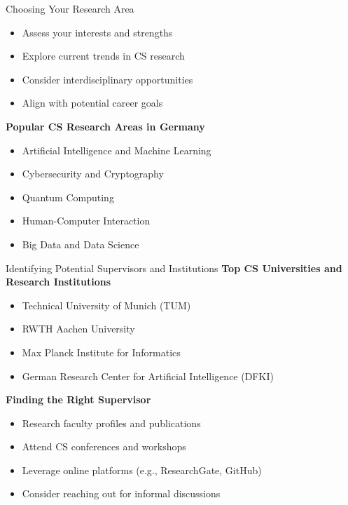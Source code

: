 \documentclass[aspectratio=169,10pt]{beamer}
\begin{document}
\begin{frame}{Choosing Your Research Area}
    \begin{itemize}
        \item Assess your interests and strengths
        \item Explore current trends in CS research
        \item Consider interdisciplinary opportunities
        \item Align with potential career goals
    \end{itemize}
    
    \textbf{Popular CS Research Areas in Germany}
    \begin{itemize}
        \item Artificial Intelligence and Machine Learning
        \item Cybersecurity and Cryptography
        \item Quantum Computing
        \item Human-Computer Interaction
        \item Big Data and Data Science
    \end{itemize}
\end{frame}

\begin{frame}{Identifying Potential Supervisors and Institutions}
    \textbf{Top CS Universities and Research Institutions}
    \begin{itemize}
        \item Technical University of Munich (TUM)
        \item RWTH Aachen University
        \item Max Planck Institute for Informatics
        \item German Research Center for Artificial Intelligence (DFKI)
    \end{itemize}
    
    \textbf{Finding the Right Supervisor}
    \begin{itemize}
        \item Research faculty profiles and publications
        \item Attend CS conferences and workshops
        \item Leverage online platforms (e.g., ResearchGate, GitHub)
        \item Consider reaching out for informal discussions
    \end{itemize}
\end{frame}
\end{document}
